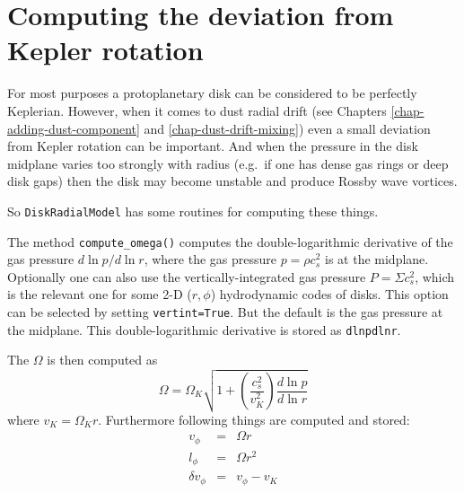 \documentclass{book}
\newcommand{\code}[1]{{\small\tt #1}}
\begin{document}
\section{Computing the deviation from Kepler rotation}
\label{sec-compute-omega}
For most purposes a protoplanetary disk can be considered to be perfectly
Keplerian.  However, when it comes to dust radial drift (see Chapters
\ref{chap-adding-dust-component} and \ref{chap-dust-drift-mixing}) even a small
deviation from Kepler rotation can be important. And when the pressure in the
disk midplane varies too strongly with radius (e.g.\ if one has dense gas rings
or deep disk gaps) then the disk may become unstable and produce Rossby wave
vortices.

So \code{DiskRadialModel} has some routines for computing these things.

The method \code{compute\_omega()} computes the
double-logarithmic derivative of the gas pressure $d\ln p/d\ln r$, where the gas
pressure $p=\rho c_s^2$ is at the midplane. Optionally one can also use the
vertically-integrated gas pressure $P=\Sigma c_s^2$, which is the relevant one
for some 2-D ($r,\phi$) hydrodynamic codes of disks. This option can be selected
by setting \code{vertint=True}. But the default is the gas pressure at the
midplane. This double-logarithmic derivative is stored as \code{dlnpdlnr}.

The $\Omega$ is then computed as
\begin{equation}
\Omega = \Omega_K \sqrt{1+\left(\frac{c_s^2}{v_K^2}\right)\frac{d\ln p}{d\ln r}}
\end{equation}
where $v_K=\Omega_K r$. Furthermore following things are computed and stored:
\begin{eqnarray}
v_\phi &=& \Omega r\\
l_\phi &=& \Omega r^2\\
\delta v_\phi &=& v_\phi - v_K
\end{eqnarray}
\end{document}
